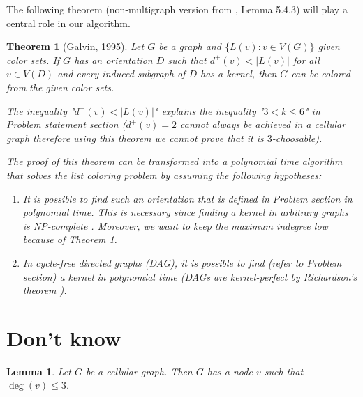 \documentclass[letterpaper, 10 pt, conference]{ieeeconf}  %
\newtheorem{thm}{Theorem}
\newtheorem{lem}{Lemma}
\begin{document}
The following theorem \cite{Galvin:1995:LCI:199352.199369} (non-multigraph version from \cite{citeulike:395714}, Lemma 5.4.3) will play a central role in our algorithm.

\begin{thm}[Galvin, 1995]\label{thm:galvin} Let $G$ be a graph and $\lbrace L(v) : v \in V(G) \rbrace$ given color sets. If $G$ has an orientation $D$ such that $d^+(v) < |L(v)|$ for all $v \in V(D)$ and every induced subgraph of $D$ has a kernel, then $G$ can be colored from the given color sets.

The inequality "$d^+(v) < |L(v)|$" explains the inequality "$3 < k \leqslant 6$" in Problem statement section ($d^+(v) = 2$ cannot always be achieved in a cellular graph therefore using this theorem we cannot prove that it is $3$-choosable).

The proof of this theorem can be transformed into a polynomial time algorithm that solves the list coloring problem by assuming the following hypotheses:

\begin{enumerate}
\item It is possible to find such an orientation that is defined in Problem section in polynomial time. This is necessary since finding a kernel in arbitrary graphs is NP-complete \cite{chvatal}. Moreover, we want to keep the maximum indegree low because of Theorem \ref{thm:galvin}.
\item In cycle-free directed graphs (DAG), it is possible to find (refer to Problem section) a kernel in polynomial time (DAGs are kernel-perfect by Richardson's theorem \cite{richardson1946}).
\end{enumerate}
\end{thm}

\section{Don't know}

\begin{lem}\label{lem:degree-constraint}
Let $G$ be a cellular graph. Then $G$ has a node $v$ such that $\deg(v) \leq 3$.
\end{lem}
\end{document}
